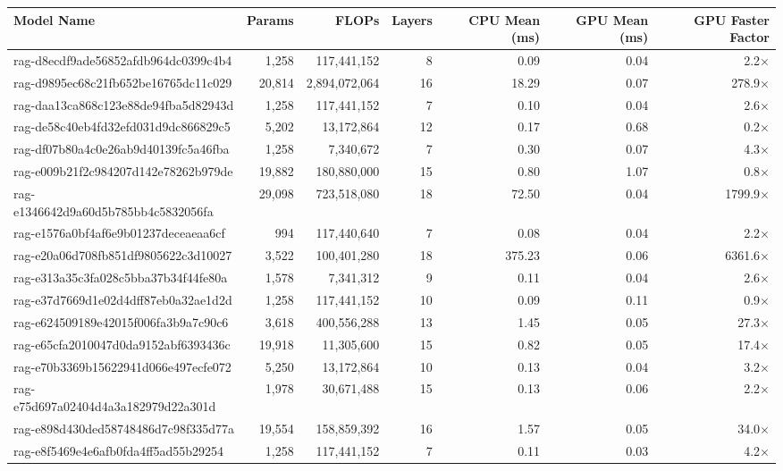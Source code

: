 \begin{table}[h!]
\centering
\fontsize{7}{9}\selectfont
\begin{tabular}{lrrrrrr}
\toprule
\textbf{Model Name} & \textbf{Params} & \textbf{FLOPs} & \textbf{Layers} & \textbf{CPU Mean (ms)} & \textbf{GPU Mean (ms)} & \textbf{GPU Faster Factor} \\
\midrule
rag-d8ecdf9ade56852afdb964dc0399c4b4 & 1,258 & 117,441,152 & 8 & 0.09 & 0.04 & 2.2$\times$ \\
rag-d9895ec68c21fb652be16765dc11c029 & 20,814 & 2,894,072,064 & 16 & 18.29 & 0.07 & 278.9$\times$ \\
rag-daa13ca868c123e88de94fba5d82943d & 1,258 & 117,441,152 & 7 & 0.10 & 0.04 & 2.6$\times$ \\
rag-de58c40eb4fd32efd031d9dc866829c5 & 5,202 & 13,172,864 & 12 & 0.17 & 0.68 & 0.2$\times$ \\
rag-df07b80a4c0e26ab9d40139fc5a46fba & 1,258 & 7,340,672 & 7 & 0.30 & 0.07 & 4.3$\times$ \\
rag-e009b21f2c984207d142e78262b979de & 19,882 & 180,880,000 & 15 & 0.80 & 1.07 & 0.8$\times$ \\
rag-e1346642d9a60d5b785bb4c5832056fa & 29,098 & 723,518,080 & 18 & 72.50 & 0.04 & 1799.9$\times$ \\
rag-e1576a0bf4af6e9b01237deceaeaa6cf & 994 & 117,440,640 & 7 & 0.08 & 0.04 & 2.2$\times$ \\
rag-e20a06d708fb851df9805622c3d10027 & 3,522 & 100,401,280 & 18 & 375.23 & 0.06 & 6361.6$\times$ \\
rag-e313a35c3fa028c5bba37b34f44fe80a & 1,578 & 7,341,312 & 9 & 0.11 & 0.04 & 2.6$\times$ \\
rag-e37d7669d1e02d4dff87eb0a32ae1d2d & 1,258 & 117,441,152 & 10 & 0.09 & 0.11 & 0.9$\times$ \\
rag-e624509189e42015f006fa3b9a7c90c6 & 3,618 & 400,556,288 & 13 & 1.45 & 0.05 & 27.3$\times$ \\
rag-e65cfa2010047d0da9152abf6393436c & 19,918 & 11,305,600 & 15 & 0.82 & 0.05 & 17.4$\times$ \\
rag-e70b3369b15622941d066e497ecfe072 & 5,250 & 13,172,864 & 10 & 0.13 & 0.04 & 3.2$\times$ \\
rag-e75d697a02404d4a3a182979d22a301d & 1,978 & 30,671,488 & 15 & 0.13 & 0.06 & 2.2$\times$ \\
rag-e898d430ded58748486d7c98f335d77a & 19,554 & 158,859,392 & 16 & 1.57 & 0.05 & 34.0$\times$ \\
rag-e8f5469e4e6afb0fda4ff5ad55b29254 & 1,258 & 117,441,152 & 7 & 0.11 & 0.03 & 4.2$\times$ \\

\end{tabular}
\end{table}
